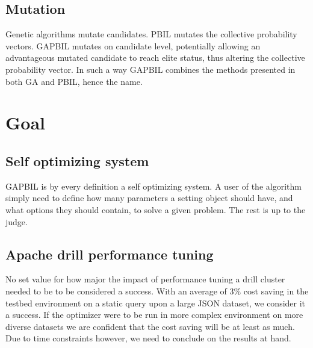 \documentclass[a4paper,english]{report}
\begin{document}
		\subsection{Mutation}
		Genetic algorithms mutate candidates. PBIL mutates the collective probability vectors. GAPBIL mutates on candidate level, potentially allowing an advantageous mutated candidate to reach elite status, thus altering the collective probability vector. In such a way GAPBIL combines the methods presented in both GA and PBIL, hence the name.
		\clearpage
		\section{Goal}
		\subsection{Self optimizing system}
		GAPBIL is by every definition a self optimizing system. A user of the algorithm simply need to define how many parameters a setting object should have, and what options they should contain, to solve a given problem. The rest is up to the judge.
		\subsection{Apache drill performance tuning}
		No set value for how major the impact of performance tuning a drill cluster needed to be to be considered a success. With an average of 3\% cost saving in the testbed environment on a static query upon a large JSON dataset, we consider it a success. If the optimizer were to be run in more complex environment on more diverse datasets we are confident that the cost saving will be at least as much. Due to time constraints however, we need to conclude on the results at hand.
\end{document}
